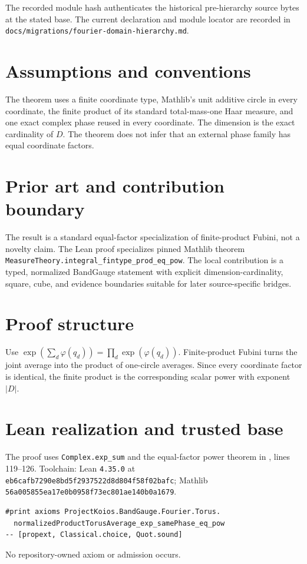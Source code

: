 \documentclass[10pt]{article}
\begin{document}
The recorded module hash authenticates the historical pre-hierarchy source bytes at the stated base. The current declaration and module locator are recorded in \texttt{docs/migrations/fourier-domain-hierarchy.md}.

\section{Assumptions and conventions}
The theorem uses a finite coordinate type, Mathlib's unit additive circle in every coordinate, the
finite product of its standard total-mass-one Haar measure, and one exact complex phase reused in
every coordinate. The dimension is the exact cardinality of $D$. The theorem does not infer that
an external phase family has equal coordinate factors.

\section{Prior art and contribution boundary}
The result is a standard equal-factor specialization of finite-product Fubini, not a novelty claim.
The Lean proof specializes pinned Mathlib theorem
\texttt{MeasureTheory.integral\_fintype\_prod\_eq\_pow}. The local contribution is a typed,
normalized BandGauge statement with explicit dimension-cardinality, square, cube, and evidence
boundaries suitable for later source-specific bridges.

\section{Proof structure}
Use $\exp(\sum_d\varphi(q_d))=\prod_d\exp(\varphi(q_d))$. Finite-product Fubini turns the
joint average into the product of one-circle averages. Since every coordinate factor is identical,
the finite product is the corresponding scalar power with exponent $|D|$.

\section{Lean realization and trusted base}
The proof uses \texttt{Complex.exp\_sum} and the equal-factor power theorem in
, lines 119--126. Toolchain: Lean
\texttt{4.35.0} at \texttt{eb6cafb7290e8bd5f2937522d8d804f58f02bafc}; Mathlib
\texttt{56a005855ea17e0b0958f73ec801ae140b0a1679}.
\begin{verbatim}
#print axioms ProjectKoios.BandGauge.Fourier.Torus.
  normalizedProductTorusAverage_exp_samePhase_eq_pow
-- [propext, Classical.choice, Quot.sound]
\end{verbatim}
No repository-owned axiom or admission occurs.
\end{document}
